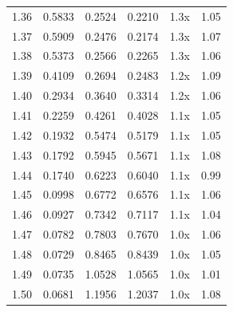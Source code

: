 \begin{tabular}{rrrrlr}
1.36 & 0.5833 & 0.2524 & 0.2210 & 1.3x & 1.05 \\
1.37 & 0.5909 & 0.2476 & 0.2174 & 1.3x & 1.07 \\
1.38 & 0.5373 & 0.2566 & 0.2265 & 1.3x & 1.06 \\
1.39 & 0.4109 & 0.2694 & 0.2483 & 1.2x & 1.09 \\
1.40 & 0.2934 & 0.3640 & 0.3314 & 1.2x & 1.06 \\
1.41 & 0.2259 & 0.4261 & 0.4028 & 1.1x & 1.05 \\
1.42 & 0.1932 & 0.5474 & 0.5179 & 1.1x & 1.05 \\
1.43 & 0.1792 & 0.5945 & 0.5671 & 1.1x & 1.08 \\
1.44 & 0.1740 & 0.6223 & 0.6040 & 1.1x & 0.99 \\
1.45 & 0.0998 & 0.6772 & 0.6576 & 1.1x & 1.06 \\
1.46 & 0.0927 & 0.7342 & 0.7117 & 1.1x & 1.04 \\
1.47 & 0.0782 & 0.7803 & 0.7670 & 1.0x & 1.06 \\
1.48 & 0.0729 & 0.8465 & 0.8439 & 1.0x & 1.05 \\
1.49 & 0.0735 & 1.0528 & 1.0565 & 1.0x & 1.01 \\
1.50 & 0.0681 & 1.1956 & 1.2037 & 1.0x & 1.08 \\
\bottomrule
\end{tabular}
